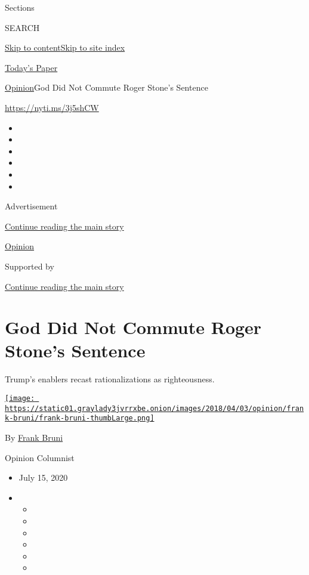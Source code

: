 Sections

SEARCH

\protect\hyperlink{site-content}{Skip to
content}\protect\hyperlink{site-index}{Skip to site index}

\href{https://myaccount.nytimes3xbfgragh.onion/auth/login?response_type=cookie\&client_id=vi}{}

\href{https://www.nytimes3xbfgragh.onion/section/todayspaper}{Today's
Paper}

\href{/section/opinion}{Opinion}\textbar{}God Did Not Commute Roger
Stone's Sentence

\href{https://nyti.ms/3j5shCW}{https://nyti.ms/3j5shCW}

\begin{itemize}
\item
\item
\item
\item
\item
\item
\end{itemize}

Advertisement

\protect\hyperlink{after-top}{Continue reading the main story}

\href{/section/opinion}{Opinion}

Supported by

\protect\hyperlink{after-sponsor}{Continue reading the main story}

\hypertarget{god-did-not-commute-roger-stones-sentence}{%
\section{God Did Not Commute Roger Stone's
Sentence}\label{god-did-not-commute-roger-stones-sentence}}

Trump's enablers recast rationalizations as righteousness.

\href{https://www.nytimes3xbfgragh.onion/by/frank-bruni}{\texttt{[image: https://static01.graylady3jvrrxbe.onion/images/2018/04/03/opinion/frank-bruni/frank-bruni-thumbLarge.png]}}

By \href{https://www.nytimes3xbfgragh.onion/by/frank-bruni}{Frank Bruni}

Opinion Columnist

\begin{itemize}
\item
  July 15, 2020
\item
  \begin{itemize}
  \item
  \item
  \item
  \item
  \item
  \item
  \end{itemize}
\end{itemize}

